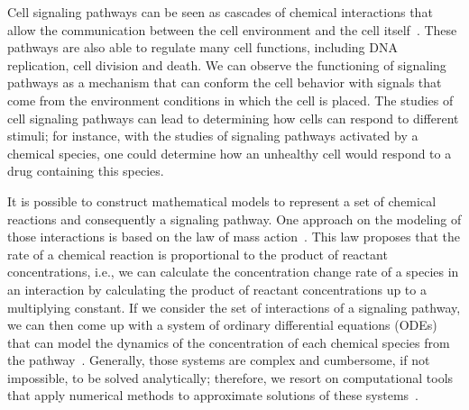 




Cell signaling pathways can be seen as cascades of chemical interactions 
that allow the communication between the cell environment and the 
cell itself~\cite{Lauffenburger5031}. These pathways are also able to
regulate many cell functions, including DNA replication, cell division
and death. We can observe the functioning of signaling pathways as a
mechanism that can conform the cell behavior with signals that come from
the environment conditions in which the cell is placed. The studies of
cell signaling pathways can lead to determining how cells can respond to
different stimuli; for instance, with the studies of signaling pathways
activated by a chemical species, one could determine how an unhealthy
cell would respond to a drug containing this species.

It is possible to construct mathematical models to represent a set of
chemical reactions and consequently a signaling pathway. One approach on 
the modeling of those interactions is based on the law of mass
action~\cite{5184956}. 
This law proposes that the rate of a chemical reaction is proportional 
to the product of reactant concentrations, i.e., we can calculate the 
concentration change rate of a species in an interaction by calculating 
the product of reactant concentrations up to a multiplying constant. 
If we consider the set of interactions of a signaling pathway, we can
then come up with a system of ordinary differential equations (ODEs) 
that can model the dynamics of the concentration of each chemical 
species from the pathway~\cite{Chen2010}. Generally, those systems are
complex and 
cumbersome, if not impossible, to be solved analytically; therefore, we 
resort on computational tools that apply numerical methods to 
approximate solutions of these systems~\cite{Chen2010}.

